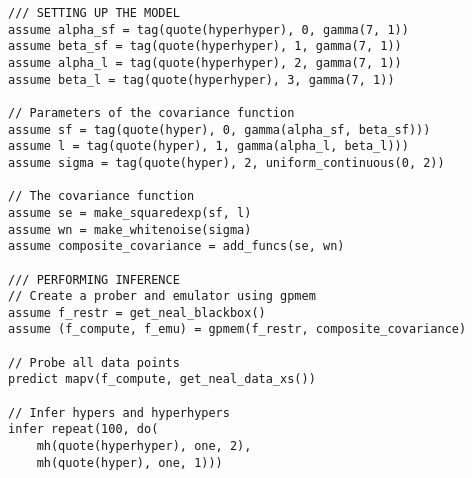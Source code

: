 \begin{minipage}{\linewidth}
\belowcaptionskip=-10pt
\begin{lstlisting}[frame=single,mathescape,label=alg:gphierarch,basicstyle=\selectfont\ttfamily,numbers=none]
/// SETTING UP THE MODEL
assume alpha_sf = tag(quote(hyperhyper), 0, gamma(7, 1))
assume beta_sf = tag(quote(hyperhyper), 1, gamma(7, 1))
assume alpha_l = tag(quote(hyperhyper), 2, gamma(7, 1))
assume beta_l = tag(quote(hyperhyper), 3, gamma(7, 1))

// Parameters of the covariance function
assume sf = tag(quote(hyper), 0, gamma(alpha_sf, beta_sf)))
assume l = tag(quote(hyper), 1, gamma(alpha_l, beta_l)))
assume sigma = tag(quote(hyper), 2, uniform_continuous(0, 2)) 

// The covariance function
assume se = make_squaredexp(sf, l)
assume wn = make_whitenoise(sigma)
assume composite_covariance = add_funcs(se, wn)

/// PERFORMING INFERENCE
// Create a prober and emulator using gpmem
assume f_restr = get_neal_blackbox()
assume (f_compute, f_emu) = gpmem(f_restr, composite_covariance)

// Probe all data points
predict mapv(f_compute, get_neal_data_xs())

// Infer hypers and hyperhypers
infer repeat(100, do(
    mh(quote(hyperhyper), one, 2),
    mh(quote(hyper), one, 1)))

\end{lstlisting}
\end{minipage}

